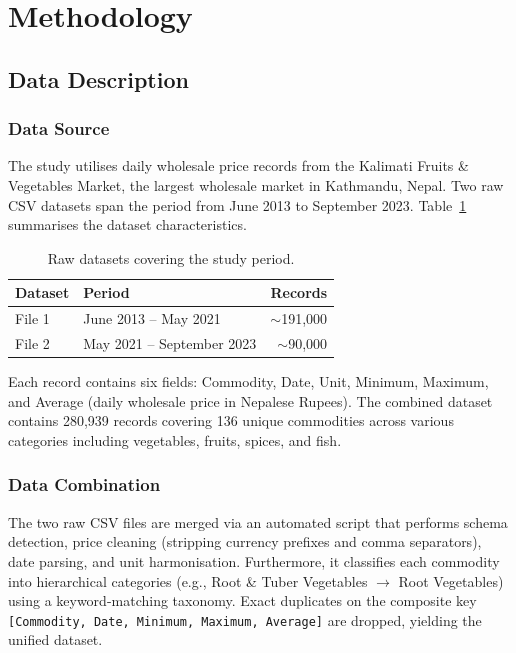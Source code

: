 \section{Methodology}
\label{sec:methodology}

\subsection{Data Description}

\subsubsection{Data Source}
The study utilises daily wholesale price records from the Kalimati Fruits \& Vegetables Market, the largest wholesale market in Kathmandu, Nepal. Two raw CSV datasets span the period from June 2013 to September 2023. Table~\ref{tab:data_sources} summarises the dataset characteristics.

\begin{table}[htbp]
\centering
\caption{Raw datasets covering the study period.}
\label{tab:data_sources}
\begin{tabular}{llr}
\toprule
\textbf{Dataset} & \textbf{Period} & \textbf{Records} \\
\midrule
File 1 & June 2013 -- May 2021 & $\sim$191,000 \\
File 2 & May 2021 -- September 2023 & $\sim$90,000 \\
\bottomrule
\end{tabular}
\end{table}

Each record contains six fields: Commodity, Date, Unit, Minimum, Maximum, and Average (daily wholesale price in Nepalese Rupees). The combined dataset contains 280,939 records covering 136 unique commodities across various categories including vegetables, fruits, spices, and fish.

\subsubsection{Data Combination}
The two raw CSV files are merged via an automated script that performs schema detection, price cleaning (stripping currency prefixes and comma separators), date parsing, and unit harmonisation. Furthermore, it classifies each commodity into hierarchical categories (e.g., Root \& Tuber Vegetables $\rightarrow$ Root Vegetables) using a keyword-matching taxonomy. Exact duplicates on the composite key \texttt{[Commodity, Date, Minimum, Maximum, Average]} are dropped, yielding the unified dataset.


